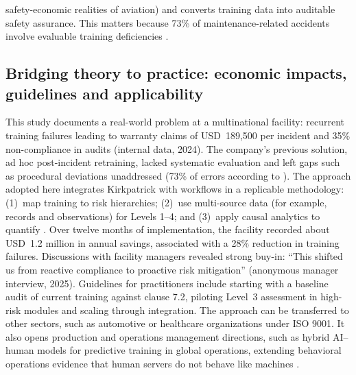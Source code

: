 safety-economic realities of aviation) and converts training data into auditable safety assurance. This matters because 73\% of maintenance-related accidents involve evaluable training deficiencies \parencite{EASA2025}. 

\subsection{Bridging theory to practice: economic impacts, guidelines and applicability}
\label{subsec:bridge}

This study documents a real-world problem at a multinational \MRO{} facility: recurrent training failures leading to warranty claims of USD~189,500 per incident and 35\% non-compliance in \AS{} audits (internal data, 2024).  The company's previous solution, ad hoc post-incident retraining, lacked systematic evaluation and left gaps such as procedural deviations unaddressed (73\% of errors according to \cite{EASA2025}).  The approach adopted here integrates Kirkpatrick with \AS{} workflows in a replicable methodology: (1)~map training to risk hierarchies; (2)~use multi-source data (for example, \LMS{} records and observations) for Levels 1--4; and (3)~apply causal analytics to quantify \ROI{}.  Over twelve months of implementation, the facility recorded about USD~1.2 million in annual savings, associated with a 28\% reduction in training failures. Discussions with facility managers revealed strong buy-in: ``This shifted us from reactive compliance to proactive risk mitigation'' (anonymous manager interview, 2025). Guidelines for practitioners include starting with a baseline audit of current training against \AS{} clause 7.2, piloting Level~3 assessment in high-risk modules and scaling through \ERP{} integration. The approach can be transferred to other sectors, such as automotive or healthcare organizations under ISO 9001. It also opens production and operations management directions, such as hybrid AI--human models for predictive training in global operations, extending behavioral operations evidence that human servers do not behave like machines \parencite{Shunko2018}.
